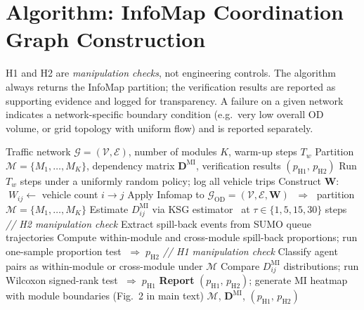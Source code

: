 \documentclass{article}
\begin{document}
\section{Algorithm: InfoMap Coordination Graph Construction}
\label{app:algorithm}

H1 and H2 are \emph{manipulation checks}, not engineering controls.
The algorithm always returns the InfoMap partition; the verification results are
reported as supporting evidence and logged for transparency.
A failure on a given network indicates a network-specific boundary condition
(e.g.\ very low overall OD volume, or grid topology with uniform flow) and is
reported separately.

\begin{algorithm}[H]
    \caption{Flow-coherent coordination graph construction with dependency verification}
    \label{alg:infomap}
    \begin{algorithmic}[1]
        \Require Traffic network $\mathcal{G} = (\mathcal{V}, \mathcal{E})$,
        number of modules $K$, warm-up steps $T_w$
        \Ensure  Partition $\mathcal{M} = \{M_1, \ldots, M_K\}$,\;
        dependency matrix $\mathbf{D}^{\mathrm{MI}}$,\;
        verification results $(p_{\mathrm{H1}},\, p_{\mathrm{H2}})$
        \State Run $T_w$ steps under a uniformly random policy; log all vehicle trips
        \State Construct $\mathbf{W}$: $\;W_{ij} \leftarrow$ vehicle count $i \to j$
        \State Apply Infomap to $\mathcal{G}_{\mathrm{OD}} = (\mathcal{V}, \mathcal{E}, \mathbf{W})$
        $\;\Rightarrow\;$ partition $\mathcal{M} = \{M_1,\ldots,M_K\}$
        \State Estimate $D^{\mathrm{MI}}_{ij}$ via KSG estimator~\citep{kraskov2004ksg}
        at $\tau \in \{1,5,15,30\}$ steps
        \Statex \hspace{1em}\textit{// H2 manipulation check}
        \State Extract spill-back events from SUMO queue trajectories
        \State Compute within-module and cross-module spill-back proportions;
        run one-sample proportion test $\;\Rightarrow\; p_{\mathrm{H2}}$
        \Statex \hspace{1em}\textit{// H1 manipulation check}
        \State Classify agent pairs as within-module or cross-module under $\mathcal{M}$
        \State Compare $D^{\mathrm{MI}}_{ij}$ distributions;
        run Wilcoxon signed-rank test $\;\Rightarrow\; p_{\mathrm{H1}}$
        \State \textbf{Report} $(p_{\mathrm{H1}},\, p_{\mathrm{H2}})$;
        generate MI heatmap with module boundaries (Fig.~2 in main text)
        \State \Return $\mathcal{M}$,\; $\mathbf{D}^{\mathrm{MI}}$,\;
        $(p_{\mathrm{H1}},\, p_{\mathrm{H2}})$
    \end{algorithmic}
\end{algorithm}
\end{document}
